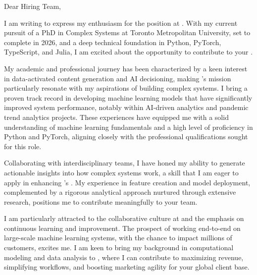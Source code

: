 \vspace{-6em}
Dear \company{} Hiring Team,
\vspace{1.0em}

\hspace{1.5em} I am writing to express my enthusiasm for the \position position at \company. With my current pursuit of a PhD in Complex Systems at Toronto Metropolitan University, set to complete in 2026, and a deep technical foundation in Python, PyTorch, TypeScript, and Julia, I am excited about the opportunity to contribute to your \team.
\vspace{1.0em}

\hspace{1.5em} My academic and professional journey has been characterized by a keen interest in data-activated content generation and AI decisioning, making \company’s mission particularly resonate with my aspirations of building complex systems. I bring a proven track record in developing machine learning models that have significantly improved system performance, notably within AI-driven analytics and pandemic trend analytics projects. These experiences have equipped me with a solid understanding of machine learning fundamentals and a high level of proficiency in Python and PyTorch, aligning closely with the professional qualifications sought for this role.
\vspace{1.0em}

\hspace{1.5em} Collaborating with interdisciplinary teams, I have honed my ability to generate actionable insights into how complex systems work, a skill that I am eager to apply in enhancing \company’s \product. My experience in feature creation and model deployment, complemented by a rigorous analytical approach nurtured through extensive research, positions me to contribute meaningfully to your team.
\vspace{1.0em}

\hspace{1.5em} I am particularly attracted to the collaborative culture at \company{} and the emphasis on continuous learning and improvement. The prospect of working end-to-end on large-scale machine learning systems, with the chance to impact millions of customers, excites me. I am keen to bring my background in computational modeling and data analysis to \company, where I can contribute to maximizing revenue, simplifying workflows, and boosting marketing agility for your global client base.
\vspace{1.0em}

